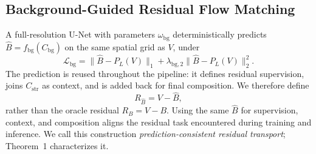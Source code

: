 \documentclass[letterpaper]{article}
\begin{document}
\subsection{Background-Guided Residual Flow Matching}
A full-resolution U-Net \cite{ronneberger2015unet} with parameters $\omega_{\mathrm{bg}}$ deterministically predicts $\hat B=f_{\mathrm{bg}}(C_{\mathrm{bg}})$ on the same spatial grid as $V$, under
\begin{equation}
\mathcal L_{\mathrm{bg}}
=
\|\hat B-P_L(V)\|_1+\lambda_{\mathrm{bg},2}\|\hat B-P_L(V)\|_2^2.
\label{eq:background-loss}
\end{equation}
The prediction is reused throughout the pipeline: it defines residual supervision, joins $C_{\mathrm{str}}$ as context, and is added back for final composition. We therefore define
\begin{equation}
R_{\hat B}=V-\hat B,
\label{eq:prediction-consistent-residual}
\end{equation}
rather than the oracle residual $R_B=V-B$. Using the same $\hat B$ for supervision, context, and composition aligns the residual task encountered during training and inference. We call this construction \emph{prediction-consistent residual transport}; Theorem~1 characterizes it.
\end{document}
